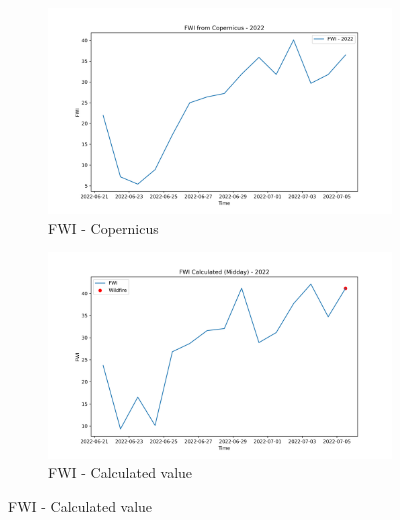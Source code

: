 \begin{figure}[h]
	\caption{Comparison of FWI calculated values and Copernicus at midday - 2022}
	\centering
	\begin{subfigure}{0.49\textwidth}
		\centering
		\includegraphics[width=\textwidth]{graphs/2022/2022CopernicusFWI12.png}
		\caption{FWI - Copernicus}
		\label{fig:fwi_copernicus_2022_midday}
	\end{subfigure}
	\hfill
	\begin{subfigure}{0.49\textwidth}
		\centering
		\includegraphics[width=\textwidth]{graphs/2022/2022CalcFWI12Midday.png}
		\caption{FWI - Calculated value}
		\label{fig:fwi_calculated_2022_midday}
	\end{subfigure}
	\label{fig:comparison_fwi_2022_midday_copernicus_calculated}
\end{figure}

\FloatBarrier

